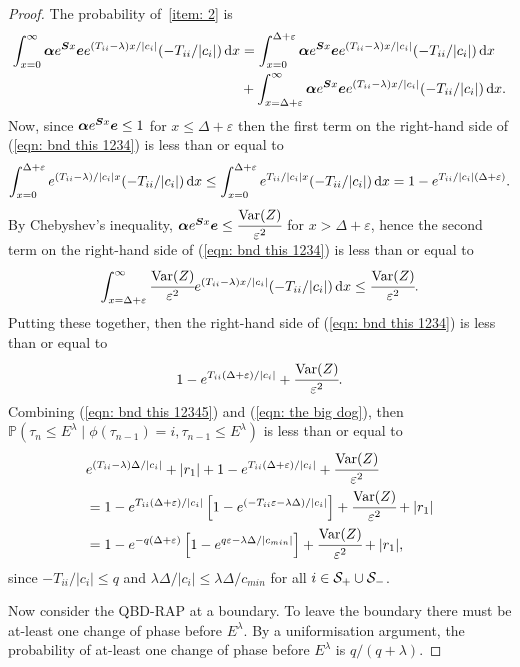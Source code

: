 \begin{proof}
	The probability of~\ref{item: 2} is 
	\begin{align}
		\nonumber\int_{x=0}^\infty \boldsymbol \alpha e^{\boldsymbol{S}x}\boldsymbol e e^{(T_{ii}-\lambda)x/|c_i|}(-T_{ii}/|c_i|)\, \mathrm{d} x 
		&= \int_{x=0}^{\Delta+\varepsilon} \boldsymbol \alpha e^{\boldsymbol{S}x}\boldsymbol ee^{(T_{ii}-\lambda)x/|c_i|}(-T_{ii}/|c_i|)\, \mathrm{d} x 
		\\&{}+\int_{x=\Delta+\varepsilon}^\infty \boldsymbol \alpha e^{\boldsymbol{S}x}\boldsymbol e e^{(T_{ii}-\lambda)x/|c_i|}(-T_{ii}/|c_i|)\, \mathrm{d} x.\label{eqn: bnd this 1234}
	\end{align}
	Now, since \(\boldsymbol \alpha e^{\boldsymbol{S}x}\boldsymbol e\leq 1\) for \(x\leq \Delta+\varepsilon\) then the first term on the right-hand side of (\ref{eqn: bnd this 1234}) is less than or equal to 
	\[\displaystyle \int_{x=0}^{\Delta+\varepsilon} e^{(T_{ii}-\lambda)/|c_i|x}(-T_{ii}/|c_i|)\, \mathrm{d} x \leq \int_{x=0}^{\Delta+\varepsilon} e^{T_{ii}/|c_i|x}(-T_{ii}/|c_i|)\, \mathrm{d} x = 1-e^{T_{ii}/|c_i|(\Delta+\varepsilon)}.\]
	By Chebyshev's inequality, \(\boldsymbol \alpha e^{\boldsymbol{S}x}\boldsymbol e\leq \cfrac{\mathrm{Var}(Z)}{\varepsilon^2}\) for \(x> \Delta+\varepsilon\), hence the second term on the right-hand side of (\ref{eqn: bnd this 1234}) is less than or equal to 
	\[\displaystyle \int_{x=\Delta+\varepsilon}^\infty \cfrac{\mathrm{Var}(Z)}{\varepsilon^2} e^{(T_{ii}-\lambda)x/|c_i|}(-T_{ii}/|c_i|)\, \mathrm{d} x \leq  \cfrac{\mathrm{Var}(Z)}{\varepsilon^2}.\]
	Putting these together, then the right-hand side of (\ref{eqn: bnd this 1234}) is less than or equal to
	\begin{align}
		1-e^{T_{ii}(\Delta+\varepsilon)/|c_i|} + \cfrac{\mathrm{Var}(Z)}{\varepsilon^2}.\label{eqn: the big dog}
	\end{align}	
	Combining (\ref{eqn: bnd this 12345}) and (\ref{eqn: the big dog}), then \(\mathbb P(\tau_n\leq E^\lambda  \mid \phi(\tau_{n-1})=i , \tau_{n-1}\leq  E^\lambda)\) is less than or equal to 
	\begin{align}
		&e^{(T_{ii}-\lambda)\Delta/|c_i|} + |r_1| + 1-e^{T_{ii}(\Delta+\varepsilon)/|c_i|} + \cfrac{\mathrm{Var}(Z)}{\varepsilon^2}\nonumber
		\\&= 1-e^{T_{ii}(\Delta+\varepsilon)/|c_i|}\left[1-e^{(-T_{ii}\varepsilon-\lambda \Delta)/|c_i|}\right] + \cfrac{\mathrm{Var}(Z)}{\varepsilon^2} + |r_1| \nonumber 
		\\&= 1-e^{-q(\Delta+\varepsilon)}\left[1-e^{q\varepsilon-\lambda \Delta/|c_{min}|}\right] + \cfrac{\mathrm{Var}(Z)}{\varepsilon^2} + |r_1|,
	\end{align}
	since \(-T_{ii}/|c_i|\leq q\) and \(\lambda \Delta/|c_i| \leq \lambda \Delta/c_{min}\) for all \(i\in\mathcal S_+\cup \mathcal{S}_-\). 
	
	Now consider the QBD-RAP at a boundary. To leave the boundary there must be at-least one change of phase before \(E^\lambda\). By a uniformisation argument, the probability of at-least one change of phase before \(E^\lambda\) is \(q/(q+\lambda)\). 
\end{proof}

